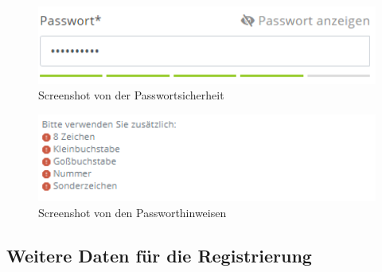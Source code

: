 \begin{figure}[H]
	\centerline{
		\includegraphics[width=1\textwidth, frame]{./grafiken/passwordSecurity.PNG}
	}
	\caption{Screenshot von der Passwortsicherheit} \label{fig:pwSec}
\end{figure}
\begin{figure}[H]
	\centerline{
	\includegraphics[width=1\textwidth, frame]{./grafiken/passwordHints.PNG}
	}	
	\caption{Screenshot von den Passworthinweisen} \label{fig:pwHints}
\end{figure}

\subsection{Weitere Daten für die Registrierung} \label{sec:weitereDatenfuer}

